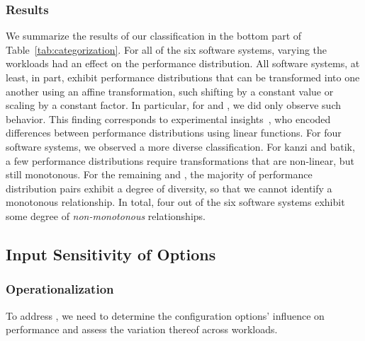 {\subsubsection{Results}
We summarize the results of our classification in the bottom part of Table~\ref{tab:categorization}. For all of the six software systems, varying the workloads had an effect on the performance distribution. All software systems, at least, in part, exhibit performance distributions that can be transformed into one another using an affine transformation, such shifting by a constant value or scaling by a constant factor. In particular, for \jumper and \jadx, we did only observe such behavior. This finding corresponds to experimental insights~\citeauthor{jamishidi_transfer_2017}, who encoded differences between performance distributions using linear functions. For four software systems, we observed a more diverse classification. For kanzi and batik, a few performance distributions require transformations that are non-linear, but still monotonous. For the remaining \dconvert and \htwo, the majority of performance distribution pairs exhibit a degree of diversity, so that we cannot identify a monotonous relationship. In total, four out of the six software systems exhibit some degree of \emph{non-monotonous} relationships.
\vspace{2mm}

\subsection{Input Sensitivity of Options}\label{sec:rq2}

\subsubsection{Operationalization}
To address , we need to determine the configuration options’ influence on performance and assess the variation thereof across workloads. 

}
